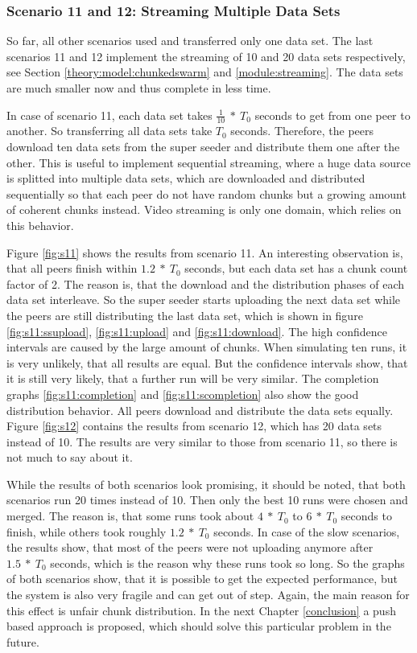 \pagebreak
\subsubsection{Scenario 11 and 12: Streaming Multiple Data Sets}

So far, all other scenarios used and transferred only one data set. The last scenarios 11 and 12 implement the streaming of 10 and 20 data sets respectively, see Section \ref{theory:model:chunkedswarm} and \ref{module:streaming}. The data sets are much smaller now and thus complete in less time.

In case of scenario 11, each data set takes $\frac{1}{10}\:*\:T_0$ seconds to get from one peer to another. So transferring all data sets take $T_0$ seconds. Therefore, the peers download ten data sets from the super seeder and distribute them one after the other. This is useful to implement sequential streaming, where a huge data source is splitted into multiple data sets, which are downloaded and distributed sequentially so that each peer do not have random chunks but a growing amount of coherent chunks instead. Video streaming is only one domain, which relies on this behavior.

Figure \ref{fig:s11} shows the results from scenario 11. An interesting observation is, that all peers finish within $1.2\:*\:T_0$ seconds, but each data set has a chunk count factor of 2. The reason is, that the download and the distribution phases of each data set interleave. So the super seeder starts uploading the next data set while the peers are still distributing the last data set, which is shown in figure \ref{fig:s11:ssupload}, \ref{fig:s11:upload} and \ref{fig:s11:download}. The high confidence intervals are caused by the large amount of chunks. When simulating ten runs, it is very unlikely, that all results are equal. But the confidence intervals show, that it is still very likely, that a further run will be very similar. The completion graphs \ref{fig:s11:completion} and \ref{fig:s11:scompletion} also show the good distribution behavior. All peers download and distribute the data sets equally. Figure \ref{fig:s12} contains the results from scenario 12, which has 20 data sets instead of 10. The results are very similar to those from scenario 11, so there is not much to say about it.

While the results of both scenarios look promising, it should be noted, that both scenarios run 20 times instead of 10. Then only the best 10 runs were chosen and merged. The reason is, that some runs took about $4\:*\:T_0$ to $6\:*\:T_0$ seconds to finish, while others took roughly $1.2\:*\:T_0$ seconds. In case of the slow scenarios, the results show, that most of the peers were not uploading anymore after $1.5\:*\:T_0$ seconds, which is the reason why these runs took so long. So the graphs of both scenarios show, that it is possible to get the expected performance, but the system is also very fragile and can get out of step. Again, the main reason for this effect is unfair chunk distribution. In the next Chapter \ref{conclusion} a push based approach is proposed, which should solve this particular problem in the future.
